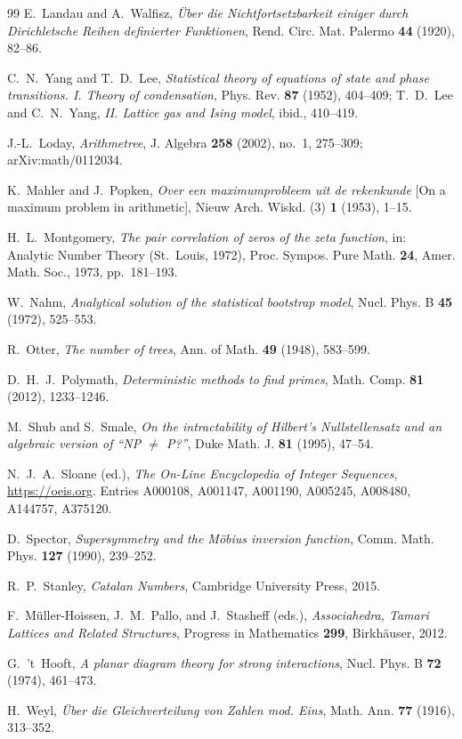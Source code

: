 \documentclass[11pt]{article}
\numberwithin{equation}{section}
\theoremstyle{plain}
\theoremstyle{definition}
\theoremstyle{remark}
\begin{document}
\begin{thebibliography}{99}
E.~Landau and A.~Walfisz,
\emph{\"Uber die Nichtfortsetzbarkeit einiger durch Dirichletsche Reihen definierter
Funktionen},
Rend. Circ. Mat. Palermo \textbf{44} (1920), 82--86.

C.~N.~Yang and T.~D.~Lee,
\emph{Statistical theory of equations of state and phase transitions. I. Theory of
condensation}, Phys. Rev. \textbf{87} (1952), 404--409;
T.~D.~Lee and C.~N.~Yang, \emph{II. Lattice gas and Ising model}, ibid., 410--419.

J.-L.~Loday,
\emph{Arithmetree},
J. Algebra \textbf{258} (2002), no.~1, 275--309; arXiv:math/0112034.

K.~Mahler and J.~Popken,
\emph{Over een maximumprobleem uit de rekenkunde} [On a maximum problem in
arithmetic],
Nieuw Arch. Wiskd. (3) \textbf{1} (1953), 1--15.

H.~L.~Montgomery,
\emph{The pair correlation of zeros of the zeta function},
in: Analytic Number Theory (St.\ Louis, 1972), Proc. Sympos. Pure Math.
\textbf{24}, Amer. Math. Soc., 1973, pp.~181--193.

W.~Nahm,
\emph{Analytical solution of the statistical bootstrap model},
Nucl. Phys. B \textbf{45} (1972), 525--553.

R.~Otter,
\emph{The number of trees},
Ann. of Math. \textbf{49} (1948), 583--599.

D.~H.~J.~Polymath,
\emph{Deterministic methods to find primes},
Math. Comp. \textbf{81} (2012), 1233--1246.

M.~Shub and S.~Smale,
\emph{On the intractability of Hilbert's Nullstellensatz and an algebraic version of
``NP $\neq$ P?''},
Duke Math. J. \textbf{81} (1995), 47--54.

N.~J.~A.~Sloane (ed.),
\emph{The On-Line Encyclopedia of Integer Sequences},
\url{https://oeis.org}. Entries A000108, A001147, A001190, A005245, A008480, A144757, A375120.

D.~Spector,
\emph{Supersymmetry and the M\"obius inversion function},
Comm. Math. Phys. \textbf{127} (1990), 239--252.

R.~P.~Stanley,
\emph{Catalan Numbers},
Cambridge University Press, 2015.

F.~M\"uller-Hoissen, J.~M.~Pallo, and J.~Stasheff (eds.),
\emph{Associahedra, Tamari Lattices and Related Structures},
Progress in Mathematics \textbf{299}, Birkh\"auser, 2012.

G.~'t~Hooft,
\emph{A planar diagram theory for strong interactions},
Nucl. Phys. B \textbf{72} (1974), 461--473.

H.~Weyl,
\emph{\"Uber die Gleichverteilung von Zahlen mod. Eins},
Math. Ann. \textbf{77} (1916), 313--352.

\end{thebibliography}
\end{document}
